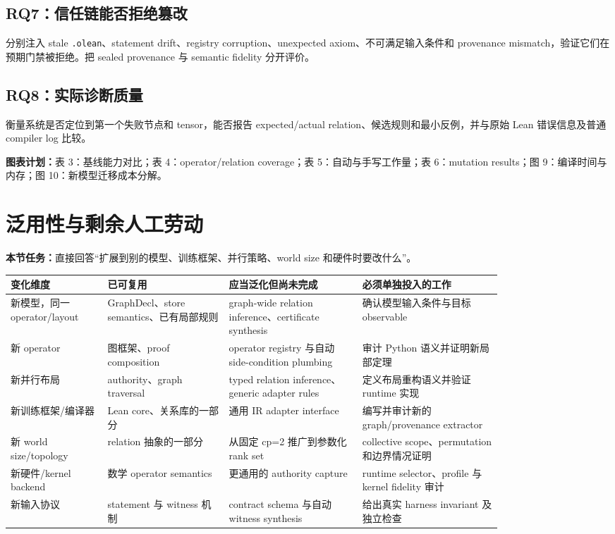 \documentclass[11pt,a4paper]{ctexart}
\newcommand{\contract}[1]{\par\smallskip\noindent\colorbox{light}{\parbox{0.95\linewidth}{\textbf{本节任务：}#1}}\par\smallskip}
\newcommand{\figplan}[1]{\par\noindent\textbf{图表计划：}#1\par}
\begin{document}
\subsection{RQ7：信任链能否拒绝篡改}
分别注入 stale \texttt{.olean}、statement drift、registry corruption、unexpected axiom、不可满足输入条件和 provenance mismatch，验证它们在预期门禁被拒绝。把 sealed provenance 与 semantic fidelity 分开评价。

\subsection{RQ8：实际诊断质量}
衡量系统是否定位到第一个失败节点和 tensor，能否报告 expected/actual relation、候选规则和最小反例，并与原始 Lean 错误信息及普通 compiler log 比较。

\figplan{表 3：基线能力对比；表 4：operator/relation coverage；表 5：自动与手写工作量；表 6：mutation results；图 9：编译时间与内存；图 10：新模型迁移成本分解。}

\section{泛用性与剩余人工劳动}
\contract{直接回答“扩展到别的模型、训练框架、并行策略、world size 和硬件时要改什么”。}

\begin{longtable}{p{0.16\linewidth}p{0.20\linewidth}p{0.22\linewidth}p{0.23\linewidth}}
\toprule
变化维度 & 已可复用 & 应当泛化但尚未完成 & 必须单独投入的工作 \\
\midrule
新模型，同一 operator/layout & GraphDecl、store semantics、已有局部规则 & graph-wide relation inference、certificate synthesis & 确认模型输入条件与目标 observable \\
新 operator & 图框架、proof composition & operator registry 与自动 side-condition plumbing & 审计 Python 语义并证明新局部定理 \\
新并行布局 & authority、graph traversal & typed relation inference、generic adapter rules & 定义布局重构语义并验证 runtime 实现 \\
新训练框架/编译器 & Lean core、关系库的一部分 & 通用 IR adapter interface & 编写并审计新的 graph/provenance extractor \\
新 world size/topology & relation 抽象的一部分 & 从固定 cp=2 推广到参数化 rank set & collective scope、permutation 和边界情况证明 \\
新硬件/kernel backend & 数学 operator semantics & 更通用的 authority capture & runtime selector、profile 与 kernel fidelity 审计 \\
新输入协议 & statement 与 witness 机制 & contract schema 与自动 witness synthesis & 给出真实 harness invariant 及独立检查 \\
\bottomrule
\end{longtable}
\end{document}
